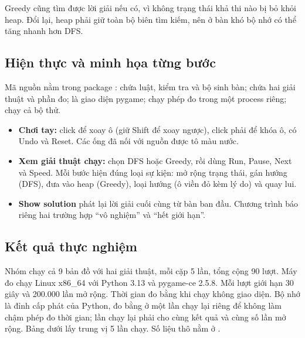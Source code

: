Greedy cũng tìm được lời giải nếu có, vì không trạng thái khả thi nào bị bỏ
khỏi heap. Đổi lại, heap phải giữ toàn bộ biên tìm kiếm, nên ở bàn khó bộ nhớ
có thể tăng nhanh hơn DFS.

\subsection{Hiện thực và minh họa từng bước}

Mã nguồn nằm trong package :  chứa luật,
kiểm tra và bộ sinh bàn;  chứa hai giải thuật và phần đo;
 là giao diện pygame;  chạy phép đo trong một
process riêng;  chạy cả bộ thử.

\begin{itemize}
\item \textbf{Chơi tay:} click để xoay ô (giữ Shift để xoay ngược), click phải
để khóa ô, có Undo và Reset. Các ống đã nối với nguồn được tô màu nước.
\item \textbf{Xem giải thuật chạy:} chọn DFS hoặc Greedy, rồi dùng Run, Pause,
Next và Speed. Mỗi bước hiện đúng loại sự kiện: mở rộng trạng thái, gán hướng
(DFS), đưa vào heap (Greedy), loại hướng (ô viền đỏ kèm lý do) và quay lui.
\item \textbf{Show solution} phát lại lời giải cuối cùng từ bàn ban đầu.
Chương trình báo riêng hai trường hợp ``vô nghiệm'' và ``hết giới hạn''.
\end{itemize}

\subsection{Kết quả thực nghiệm}

Nhóm chạy cả 9 bản đồ với hai giải thuật, mỗi cặp 5 lần, tổng cộng 90 lượt.
Máy đo chạy Linux x86\_64 với Python 3.13 và pygame-ce 2.5.8. Mỗi lượt giới hạn
30 giây và 200.000 lần mở rộng. Thời gian đo bằng  khi chạy
không giao diện. Bộ nhớ là đỉnh cấp phát của Python, đo bằng 
ở một lần chạy lại riêng để không làm chậm phép đo thời gian; lần chạy lại phải
cho cùng kết quả và cùng số lần mở rộng. Bảng dưới lấy trung vị 5 lần chạy.
Số liệu thô nằm ở .

